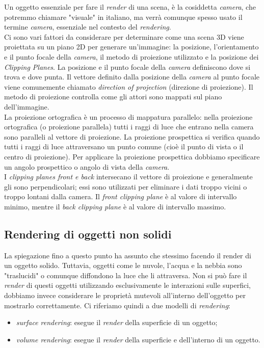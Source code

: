 Un oggetto essenziale per fare il \emph{render} di una scena, è la cosiddetta \emph{camera}, che potremmo chiamare "visuale" in italiano, ma verrà comunque spesso usato il termine \emph{camera}, essenziale nel contesto del \emph{rendering}.
\\
Ci sono vari fattori da considerare per determinare come una scena 3D viene proiettata su un piano 2D per generare un'immagine: la posizione, l'orientamento e il punto focale della \emph{camera}, il metodo di proiezione utilizzato e la posizione dei \emph{Clipping Planes}. La posizione e il punto focale della \emph{camera} definiscono dove si trova e dove punta. Il vettore definito dalla posizione della \emph{camera} al punto focale viene comunemente chiamato \emph{direction of projection} (direzione di proiezione). Il metodo di proiezione controlla come gli attori sono mappati sul piano dell'immagine.
\\
La proiezione ortografica è un processo di mappatura parallelo: nella proiezione ortografica (o proiezione parallela) tutti i raggi di luce che entrano nella camera sono paralleli al vettore di proiezione. La proiezione prospettica si verifica quando tutti i raggi di luce attraversano un punto comune (cioè il punto di vista o il centro di proiezione). Per applicare la proiezione prospettica dobbiamo specificare un angolo prospettico o angolo di vista della \emph{camera}.
\\
I \emph{clipping planes front e back} intersecano il vettore di proiezione e generalmente gli sono perpendicolari; essi sono utilizzati per eliminare i dati troppo vicini o troppo lontani dalla camera. Il \emph{front clipping plane} è al valore di intervallo minimo, mentre il \emph{back clipping plane} è al valore di intervallo massimo.

\subsection{Rendering di oggetti non solidi}
La spiegazione fino a questo punto ha assunto che stessimo facendo il render di un oggetto solido. Tuttavia, oggetti come le nuvole, l'acqua e la nebbia sono "traslucidi" o comunque diffondono la luce che li attraversa. Non si può fare il \emph{render} di questi oggetti utilizzando esclusivamente le interazioni sulle superfici, dobbiamo invece considerare le proprietà mutevoli all'interno dell'oggetto per mostrarlo correttamente. Ci riferiamo quindi a due modelli di \emph{rendering}:
\begin{itemize}
\item \emph{surface rendering}: esegue il \emph{render} della superficie di un oggetto;
\item \emph{volume rendering}: esegue il \emph{render} della superficie e dell'interno di un oggetto.
\end{itemize}

